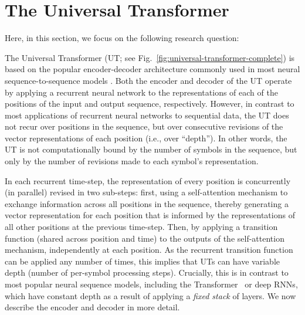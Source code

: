 \section{The Universal Transformer }%
Here, in this section, we focus on the following research question:

The Universal Transformer (UT; see Fig.~\ref{fig:universal-transformer-complete}) is based on the popular encoder-decoder architecture commonly used in most neural sequence-to-sequence models \citep{sutskever14,cho2014learning,transformer}. Both the encoder and decoder of the UT operate by applying a recurrent neural network to the representations of each of the positions of the input and output sequence, respectively. However, in contrast to most applications of recurrent neural networks to sequential data, the UT does not recur over positions in the sequence, but over consecutive revisions of the vector representations of each position (i.e., over ``depth''). In other words, the UT is not computationally bound by the number of symbols in the sequence, but only by the number of revisions made to each symbol's representation.

In each recurrent time-step, the representation of every position is concurrently (in parallel) revised in two sub-steps: first, using a self-attention mechanism to exchange information across all positions in the sequence, thereby generating a vector representation for each position that is informed by the representations of all other positions at the previous time-step. Then, by applying a transition function (shared across position and time) to the outputs of the self-attention mechanism, independently at each position. As the recurrent transition function can be applied any number of times, this implies that UTs can have variable depth (number of per-symbol processing steps). Crucially, this is in contrast to most popular neural sequence models, including the Transformer~\citep{transformer} or deep RNNs, which have constant depth as a result of applying a \emph{fixed stack} of layers. We now describe the encoder and decoder in more detail.

